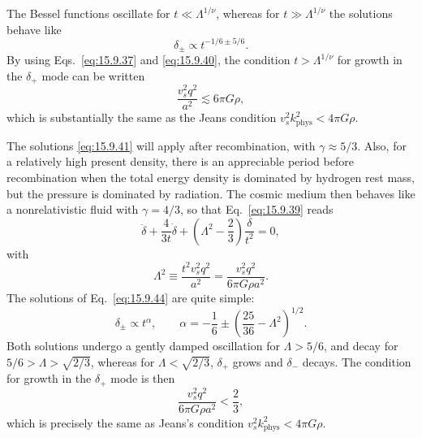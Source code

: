 The Bessel functions oscillate for \(t\ll\Lambda^{1/\nu}\), whereas for
\(t\gg\Lambda^{1/\nu}\) the solutions behave like
\begin{equation}
  \delta_\pm\propto t^{-1/6\pm5/6}.
  \tag{15.9.43}\label{eq:15.9.43}
\end{equation}
By using Eqs.~\eqref{eq:15.9.37} and \eqref{eq:15.9.40}, the condition
\(t>\Lambda^{1/\nu}\) for growth in the \(\delta_+\) mode can be written
\[
  \frac{v_s^2q^2}{a^2}\lesssim6\pi G\rho,
\]
which is substantially the same as the Jeans condition
\(v_s^2k_{\mathrm{phys}}^2<4\pi G\rho\).

The solutions \eqref{eq:15.9.41} will apply after recombination, with
\(\gamma\approx5/3\). Also, for a relatively high present density, there is
an appreciable period before recombination when the total energy density is
dominated by hydrogen rest mass, but the pressure is dominated by radiation.
The cosmic medium then behaves like a nonrelativistic fluid with
\(\gamma=4/3\), so that Eq.~\eqref{eq:15.9.39} reads
\begin{equation}
  \ddot\delta
  +\frac4{3t}\dot\delta
  +\left(\Lambda^2-\frac23\right)\frac{\delta}{t^2}
  =0,
  \tag{15.9.44}\label{eq:15.9.44}
\end{equation}
with
\begin{equation}
  \Lambda^2
  \equiv
  \frac{t^2v_s^2q^2}{a^2}
  =
  \frac{v_s^2q^2}{6\pi G\rho a^2}.
  \tag{15.9.45}\label{eq:15.9.45}
\end{equation}
The solutions of Eq.~\eqref{eq:15.9.44} are quite simple:
\begin{equation}
  \delta_\pm\propto t^\alpha,
  \qquad
  \alpha=-\frac16\pm\left(\frac{25}{36}-\Lambda^2\right)^{1/2}.
  \tag{15.9.46}\label{eq:15.9.46}
\end{equation}
Both solutions undergo a gently damped oscillation for
\(\Lambda>5/6\), and decay for \(5/6>\Lambda>\sqrt{2/3}\), whereas for
\(\Lambda<\sqrt{2/3}\), \(\delta_+\) grows and \(\delta_-\) decays. The
condition for growth in the \(\delta_+\) mode is then
\[
  \frac{v_s^2q^2}{6\pi G\rho a^2}<\frac23,
\]
which is precisely the same as Jeans's condition
\(v_s^2k_{\mathrm{phys}}^2<4\pi G\rho\).

